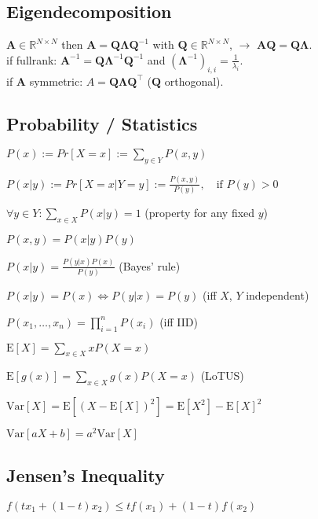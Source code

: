 \subsection*{Eigendecomposition}
$\mathbf{A} \in \mathbb{R}^{N \times N}$ then $\mathbf{A} = \mathbf{Q} \boldsymbol{\Lambda} \mathbf{Q}^{-1}$ with $\mathbf{Q} \in \mathbb{R}^{N \times N}$, $\rightarrow$ $\mathbf{A}\mathbf{Q} = \mathbf{Q}\boldsymbol{\Lambda}$.\\
if fullrank: $\mathbf{A}^{-1} = \mathbf{Q} \boldsymbol{\Lambda}^{-1} \mathbf{Q}^{-1}$ and $(\boldsymbol{\Lambda}^{-1})_{i,i} = \frac{1}{\lambda_i}$.\\
if $\mathbf{A}$ symmetric: $A = \mathbf{Q} \boldsymbol{\Lambda} \mathbf{Q^\top}$ ($\mathbf{Q}$ orthogonal).

\subsection*{Probability / Statistics}
\begin{inparaitem}
	\item $P(x) := Pr[X = x] := \sum_{y \in Y} P(x, y)$
	\item $P(x|y) := Pr[X = x | Y = y] := \frac{P(x,y)}{P(y)},\quad \text{if } P(y) > 0$
	\item $\forall y \in Y: \sum_{x \in X} P(x|y) = 1$ (property for any fixed $y$)
	\item $P(x, y) = P(x|y) P(y)$
	\item $P(x|y) = \frac{P(y|x)P(x)}{P(y)}$ (Bayes' rule)
	\item $P(x|y) = P(x) \Leftrightarrow P(y|x) = P(y)$ (iff $X$, $Y$ independent)
	\item $P(x_1, \ldots, x_n) = \prod_{i=1}^n P(x_i)$ (iff IID)
    \item $\mathrm{E}[X] = \sum_{x \in X} x P(X = x)$
    \item $\mathrm{E}[g(x)] = \sum_{x \in X} g(x) P(X = x)$ (LoTUS)
    \item $\mathrm{Var}[X] = \mathrm{E}[(X - \mathrm{E}[X])^2] = \mathrm{E}[X^2] - \mathrm{E}[X]^2$
    \item $\mathrm{Var}[aX + b] = a^2 \mathrm{Var}[X]$
\end{inparaitem}

\subsection*{Jensen's Inequality}
$f(tx_1 + (1 - t)x_2) \leq tf(x_1) + (1 - t)f(x_2)$
